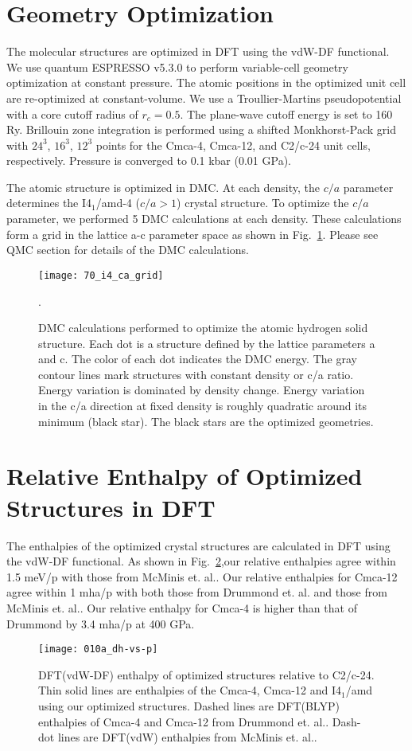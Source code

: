 \section{Geometry Optimization}
The molecular structures are optimized in DFT using the vdW-DF functional. We use quantum ESPRESSO v5.3.0 to perform variable-cell geometry optimization at constant pressure. The atomic positions in the optimized unit cell are re-optimized at constant-volume. We use a Troullier-Martins pseudopotential with a core cutoff radius of $r_c=0.5$. The plane-wave cutoff energy is set to 160 Ry. Brillouin zone integration is performed using a shifted Monkhorst-Pack grid with $24^3$, $16^3$, $12^3$ points for the Cmca-4, Cmca-12, and C2/c-24 unit cells, respectively. %
Pressure is converged to 0.1 kbar (0.01 GPa). %

The atomic structure is optimized in DMC. At each density, the $c/a$ parameter determines the I4$_1$/amd-4 ($c/a>1$) crystal structure. To optimize the $c/a$ parameter, we performed 5 DMC calculations at each density. These calculations form a grid in the lattice a-c parameter space as shown in Fig.~\ref{fig:i4-rs-ca}. Please see QMC section for details of the DMC calculations.
\begin{figure}[h]
\texttt{[image: 70\_i4\_ca\_grid]}
\caption{DMC calculations performed to optimize the atomic hydrogen solid structure. Each dot is a structure defined by the lattice parameters a and c. The color of each dot indicates the DMC energy. The gray contour lines mark structures with constant density or c/a ratio. Energy variation is dominated by density change. Energy variation in the c/a direction at fixed density is roughly quadratic around its minimum (black star). The black stars are the optimized geometries.\label{fig:i4-rs-ca}}.
\end{figure}

\section{Relative Enthalpy of Optimized Structures in DFT}
The enthalpies of the optimized crystal structures are calculated in DFT using the vdW-DF functional. As shown in Fig.~\ref{fig:dft-opt-geo},our relative enthalpies agree within 1.5 meV/p with those from McMinis et. al.. Our relative enthalpies for Cmca-12 agree within 1 mha/p with both those from Drummond et. al. and those from McMinis et. al.. Our relative enthalpy for Cmca-4 is higher than that of Drummond by 3.4 mha/p at 400 GPa. %
\begin{figure}[h]
\texttt{[image: 010a\_dh-vs-p]}
\caption{DFT(vdW-DF) enthalpy of optimized structures relative to C2/c-24. Thin solid lines are enthalpies of the Cmca-4, Cmca-12 and I4$_1$/amd using our optimized structures. Dashed lines are DFT(BLYP) enthalpies of Cmca-4 and Cmca-12 from Drummond et. al.. Dash-dot lines are DFT(vdW) enthalpies from McMinis et. al..\label{fig:dft-opt-geo}}
\end{figure}
